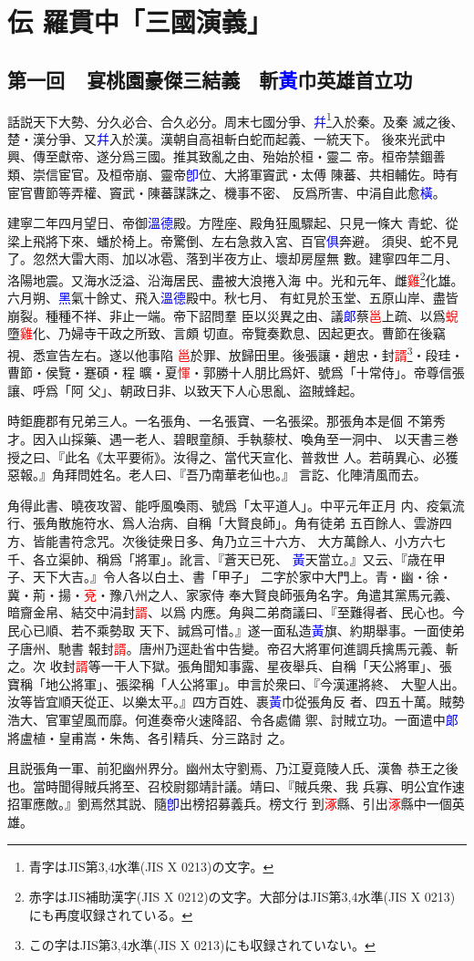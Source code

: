 ﻿\documentclass[twocolumn]{utarticle}
\newcommand{\hojo}[1]{\textcolor{red}{#1}}
\newcommand{\newjis}[1]{\textcolor{blue}{#1}}
\begin{document}
\section{伝 羅貫中「三國演義」}

\subsection*{第一回~~宴桃園豪傑三結義　斬\newjis{黃}巾英雄首立功}

話説天下大勢、分久必合、合久必分。周末七國分爭、\newjis{幷}\footnote{青字はJIS第3,4水準(JIS X 0213)の文字。}入於秦。及秦
滅之後、楚・漢分爭、又\newjis{幷}入於漢。漢朝自高祖斬白蛇而起義、一統天下。
後來光武中興、傳至獻帝、遂分爲三國。推其致亂之由、殆始於桓・靈二
帝。桓帝禁錮善類、崇信宦官。及桓帝崩、靈帝\newjis{卽}位、大將軍竇武・太傅
陳蕃、共相輔佐。時有宦官曹節等弄權、竇武・陳蕃謀誅之、機事不密、
反爲所害、中涓自此愈\newjis{橫}。

建寧二年四月望日、帝御\newjis{溫德}殿。方陞座、殿角狂風驟起、只見一條大
青蛇、從梁上飛將下來、蟠於椅上。帝驚倒、左右急救入宮、百官\newjis{俱}奔避。
須臾、蛇不見了。忽然大雷大雨、加以冰雹、落到半夜方止、壞却房屋無
數。建寧四年二月、洛陽地震。又海水泛溢、沿海居民、盡被大浪捲入海
中。光和元年、雌\hojo{雞}\footnote{赤字はJIS補助漢字(JIS X 0212)の文字。大部分はJIS第3,4水準(JIS X 0213)にも再度収録されている。}化雄。六月朔、\newjis{黑}氣十餘丈、飛入\newjis{溫德}殿中。秋七月、
有虹見於玉堂、五原山岸、盡皆崩裂。種種不祥、非止一端。帝下詔問羣
臣以災異之由、議\newjis{郞}蔡\hojo{邕}上疏、以爲\hojo{蜺}墮\hojo{雞}化、乃婦寺干政之所致、言頗
切直。帝覽奏歎息、因起更衣。曹節在後竊視、悉宣告左右。遂以他事陷
\hojo{邕}於罪、放歸田里。後張讓・趙忠・封\hojo{諝}\footnote{この字はJIS第3,4水準(JIS X 0213)にも収録されていない。}・段珪・曹節・侯覽・蹇碩・程
曠・夏\hojo{惲}・郭勝十人朋比爲奸、號爲「十常侍」。帝尊信張讓、呼爲「阿
父」、朝政日非、以致天下人心思亂、盜賊蜂起。

時鉅鹿郡有兄弟三人。一名張角、一名張寶、一名張梁。那張角本是個
不第秀才。因入山採藥、遇一老人、碧眼童顏、手執藜杖、喚角至一洞中、
以天書三巻授之曰、『此名《太平要術》。汝得之、當代天宣化、普救世
人。若萌異心、必獲惡報。』角拜問姓名。老人曰、『吾乃南華老仙也。』
言訖、化陣清風而去。

角得此書、曉夜攻習、能呼風喚雨、號爲「太平道人」。中平元年正月
内、疫氣流行、張角散施符水、爲人治病、自稱「大賢良師」。角有徒弟
五百餘人、雲游四方、皆能書符念咒。次後徒衆日多、角乃立三十六方、
大方萬餘人、小方六七千、各立渠帥、稱爲「將軍」。訛言、『蒼天已死、
\newjis{黃}天當立。』又云、『歳在甲子、天下大吉。』令人各以白土、書「甲子」
二字於家中大門上。青・幽・徐・冀・荊・揚・\hojo{兗}・豫八州之人、家家侍
奉大賢良師張角名字。角遣其黨馬元義、暗齎金帛、結交中涓封\hojo{諝}、以爲
内應。角與二弟商議曰、『至難得者、民心也。今民心已順、若不乘勢取
天下、誠爲可惜。』遂一面私造\newjis{黃}旗、約期舉事。一面使弟子唐州、馳書
報封\hojo{諝}。唐州乃逕赴省中告變。帝召大將軍何進調兵擒馬元義、斬之。次
收封\hojo{諝}等一干人下獄。張角聞知事露、星夜舉兵、自稱「天公將軍」、張
寶稱「地公將軍」、張梁稱「人公將軍」。申言於衆曰、『今漢運將終、
大聖人出。汝等皆宜順天從正、以樂太平。』四方百姓、裹\newjis{黃}巾從張角反
者、四五十萬。賊勢浩大、官軍望風而靡。何進奏帝火速降詔、令各處備
禦、討賊立功。一面遣中\newjis{郞}將盧植・皇甫嵩・朱雋、各引精兵、分三路討
之。

且説張角一軍、前犯幽州界分。幽州太守劉焉、乃江夏竟陵人氏、漢魯
恭王之後也。當時聞得賊兵將至、召校尉鄒靖計議。靖曰、『賊兵衆、我
兵寡、明公宜作速招軍應敵。』劉焉然其説、隨\newjis{卽}出榜招募義兵。榜文行
到\hojo{涿}縣、引出\hojo{涿}縣中一個英雄。
\end{document}
